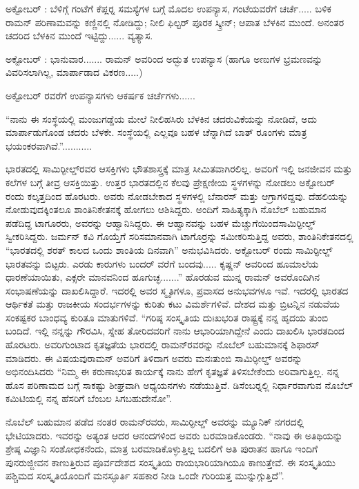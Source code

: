 \vskip 2.5pt

ಅಕ್ಟೋಬರ್ : ಬೆಳಿಗ್ಗೆ  ಗಂಟೆಗೆ ಕೆಪ್ಲರ್‍ನ ಸಮಸ್ಯೆಗಳ ಬಗ್ಗೆ ಮೊದಲ ಉಪನ್ಯಾಸ,  ಗಂಟೆಯವರೆಗೆ ಚರ್ಚೆ..... ಬಳಿಕ ರಾಮನ್ ಪರಿಣಾಮವನ್ನು ಕಣ್ಣಿನಲ್ಲಿ ನೋಡಿದ್ದು; ನೀಲಿ ಫಿಲ್ಟರ್ ಪೂರಕ ಸ್ಕ್ರೀನ್; ಆಪಾತ ಬೆಳಕಿನ ಮುಂದೆ. ಅನಂತರ ಚದರಿದ ಬೆಳಕಿನ ಮುಂದೆ ಇಟ್ಟಿದ್ದು...... ವ್ಯತ್ಯಾಸ.

ಅಕ್ಟೋಬರ್ : ಭಾನುವಾರ....... ರಾಮನ್ ಅವರಿಂದ ಅದ್ಭುತ ಉಪನ್ಯಾಸ (ಹಾಗೂ ಅಣುಗಳ ಭ್ರಮಣವನ್ನು ವಿವರಿಸಲಾಗಿಲ್ಲ, ಮಾರ್ಪಾಡಾದ ವಿಕರಣ.....) 

ಅಕ್ಟೋಬರ್  ರವರೆಗೆ ಉಪನ್ಯಾಸಗಳು ಆಕರ್ಷಕ ಚರ್ಚೆಗಳು...... 

“ನಾನು ಈ ಸಂಸ್ಥೆಯಲ್ಲಿ ಮಂಜುಗಡ್ಡೆಯ ಮೇಲೆ ನೀಲಿ\enginline{-}ಹಸಿರು ಬೆಳಕಿನ ಚದರುವಿಕೆಯನ್ನು ನೋಡಿದೆ, ಅದು ಮಾರ್ಪಾಡುಗೊಂಡ ಚದರು ಬೆಳಕೇ. ಸಂಸ್ಥೆಯಲ್ಲಿ ಎಲ್ಲವೂ ಬಹಳ ಚೆನ್ನಾಗಿದೆ ಬಾತ್ ರೂಂಗಳು ಮಾತ್ರ ಭಯಂಕರವಾಗಿವೆ.”...........

ಭಾರತದಲ್ಲಿ ಸಾಮಿರ್‍ಫೀಲ್ಡ್‌ರವರ ಆಸಕ್ತಿಗಳು ಭೌತಶಾಸ್ತ್ರಕ್ಕೆ ಮಾತ್ರ ಸೀಮಿತವಾಗಿರಲಿಲ್ಲ. ಅವರಿಗೆ ಇಲ್ಲಿ ಜನಜೀವನ ಮತ್ತು ಕಲೆಗಳ ಬಗ್ಗೆ ತೀವ್ರ ಆಸಕ್ತಿಯಿತ್ತು. ಉತ್ತರ ಭಾರತದಲ್ಲಿನ ಕೆಲವು ಪ್ರೇಕ್ಷಣೀಯ ಸ್ಥಳಗಳನ್ನು ನೋಡಲು  ಅಕ್ಟೋಬರ್ ರಂದು ಕಲ್ಕತ್ತದಿಂದ ಹೊರಟರು. ಅವರು ನೋಡಬೇಕಾದ ಸ್ಥಳಗಳಲ್ಲಿ ಬೆನಾರಸ್ ಮತ್ತು ಆಗ್ರಾಗಳಿದ್ದವು. ದೆಹಲಿಯನ್ನು ನೋಡುವುದಕ್ಕಿಂತಲೂ ಶಾಂತಿನಿಕೇತನಕ್ಕೆ ಹೋಗಲು ಆಶಿಸಿದ್ದರು. ಅಂದಿಗೆ ಸಾಹಿತ್ಯಕ್ಕಾಗಿ ನೊಬೆಲ್ ಬಹುಮಾನ ಪಡೆದಿದ್ದ ಟಾಗೂರರು, ಅವರನ್ನು ಆಹ್ವಾನಿಸಿದ್ದರು. ಈ ಆಹ್ವಾನವನ್ನು ಬಹಳ ಮೆಚ್ಚುಗೆಯಿಂದ\break ಸಾಮಿರ್‍ಫೀಲ್ಡ್ ಸ್ವೀಕರಿಸಿದ್ದರು. ಜರ್ಮನ್ ಕವಿ ಗೊಯ್ತೆಗೆ ಸರಿಸಮಾನವಾಗಿ ಟಾಗೊರ್‍ರನ್ನು ಸಮೀಕರಿಸುತ್ತಿದ್ದ ಅವರು, ಶಾಂತಿನಿಕೇತನದಲ್ಲಿ “ಭಾರತದಲ್ಲಿ ಶರತ್ ಕಾಲದ ಒಂದು ಶಾಂತಿಯ ದಿನವಾಗಿ” ಅನುಭವಿಸಿದರು. ಅಕ್ಟೋಬರ್  ರಂದು ಸಾಮಿರ್‍ಫೀಲ್ಡ್ ಭಾರತವನ್ನು ಬಿಟ್ಟರು. ಎರಡು ಕಾರುಗಳು ಬಂದರ್ ವರೆಗೆ ಬಂದವು..... ಕೃಷ್ಣನ್ ಅವರಿಂದ ಹೂಮಾಲೆಯ ಧಾರಣೆಯಾಯಿತು, ಎಕ್ಸರೇ ಮಾನವನಿಂದ ಹೂಗುಚ್ಛ.......” ಹೊರಡುವ ಮುನ್ನ ರಾಮನ್ ಅವರೊಂದಿಗಿನ ಸಂಭಾಷಣೆಯನ್ನು ದಾಖಲಿಸಿದ್ದಾರೆ. ಇದರಲ್ಲಿ ಅವರ ಸ್ಮೃತಿಗಳೂ, ಪ್ರವಾಸದ ಅನುಭವಗಳೂ ಇವೆ. ಇದರಲ್ಲಿ ಭಾರತದ ಆರ್ಥಿಕತೆ ಮತ್ತು ರಾಜಕೀಯ ಸಂದರ್ಭಗಳನ್ನು ಕುರಿತು ಕಟು ವಿಮರ್ಶೆಗಳಿವೆ. ದೇಶದ ಮತ್ತು ಬ್ರಿಟನ್ನಿನ ನಡುವೆಯ ಸಂಕಷ್ಟಕರ ಬಾಂಧವ್ಯ ಕುರಿತೂ ಮಾತುಗಳಿವೆ. “ಗರಿಷ್ಠ ಸಂಸ್ಕೃತಿಯ ದುಃಖಭರಿತ ರಾಷ್ಟ್ರಕ್ಕೆ ನನ್ನ ಹೃದಯ ತುಂಬಿ ಬಂದಿದೆ. ಇಲ್ಲಿ ನನ್ನನ್ನು ಗೌರವಿಸಿ, ಸ್ನೇಹ ತೋರಿದವರಿಗೆ ನಾನು ಆಭಾರಿಯಾಗಿದ್ದೇನೆ ಎಂದು ದಾಖಲಿಸಿ ಭಾರತದಿಂದ ಹೊರಟರು. ಅವರಿಗುಂಟಾದ ಕೃತಜ್ಞತೆಯ ಭಾರದಲ್ಲಿ ರಾಮನ್‍ರವರನ್ನು ನೊಬೆಲ್ ಬಹುಮಾನಕ್ಕೆ ಶಿಫಾರಸ್ ಮಾಡಿದರು. ಈ ವಿಷಯವು\break ರಾಮನ್ ಅವರಿಗೆ ತಿಳಿದಾಗ ಅವರು ಮನಃತುಂಬಿ ಸಾಮಿರ್‍ಫೀಲ್ಡ್ ಅವರನ್ನು ಅಭಿನಂದಿಸಿದರು\enginline{-} “ನಿಮ್ಮ ಈ ಕರುಣಾಭರಿತ ಕಾರ್ಯಕ್ಕೆ ನಾನು ಹೇಗೆ ಕೃತಜ್ಞತೆ ತಿಳಿಸಬೇಕೆಂದು ಅರಿವಾಗುತ್ತಿಲ್ಲ. ನನ್ನ ಹೊಸ ಪರಿಣಾಮದ ಬಗ್ಗೆ ಸಾಕಷ್ಟು ಶೀಘ್ರವಾಗಿ ಅಧ್ಯಯನಗಳು ನಡೆಯುತ್ತಿವೆ. ಡಿಸೆಂಬರ್‍ನಲ್ಲಿ ನಿರ್ಧಾರವಾಗುವ ನೊಬೆಲ್ ಕಮಿಟಿಯಲ್ಲಿ ನನ್ನ ಹೆಸರಿಗೆ ಬೆಂಬಲ ಸಿಗಬಹುದೇನೋ”.

ನೊಬೆಲ್ ಬಹುಮಾನ ಪಡೆದ ನಂತರ ರಾಮನ್‍ರವರು, ಸಾಮಿರ್‍ಫೀಲ್ಡ್ ಅವರನ್ನು ಮ್ಯೂನಿಕ್ ನಗರದಲ್ಲಿ ಭೇಟಿಯಾದರು. ಇವರನ್ನು ಅತ್ಯಂತ ಆದರ ಆನಂದಗಳಿಂದ ಅವರು ಬರಮಾಡಿಕೊಂಡರು. “ನಾವು ಈ ಅತಿಥಿಯನ್ನು ಶ್ರೇಷ್ಠ ವಿಜ್ಞಾನಿ ಸಂಶೋಧಕನೆಂದು, ಮಾತ್ರ ಬರಮಾಡಿಕೊಳ್ಳುತ್ತಿಲ್ಲ ಬದಲಿಗೆ ಅತಿ ಪುರಾತನ ಹಾಗೂ ಇಂದಿಗೆ ಪುನರುಜ್ಜೀವನ ಕಾಣುತ್ತಿರುವ ಪೂರ್ವದೇಶದ ಸಂಸ್ಕೃತಿಯ ರಾಯಭಾರಿಯಾಗಿಯೂ ಕಾಣುತ್ತೇವೆ. ಈ ಸಂಸ್ಕೃತಿಯು ಪಶ್ಚಿಮದ ಸಂಸ್ಕೃತಿಯೊಂದಿಗೆ ಮನಸ್ಫೂರ್ತಿ ಸಹಕಾರ ನೀಡಿ ಒಂದೇ ಗುರಿಯತ್ತ ಮುನ್ನುಗ್ಗುತ್ತಿದೆ”.

